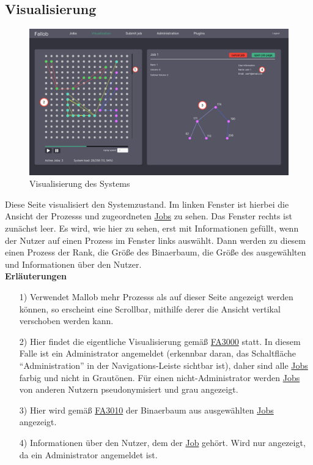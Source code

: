 \newpage
\subsection{Visualisierung}
\label{pages:visualization}
\begin{figure}[H]
    \centering
    \includegraphics[width=\textwidth]{images-interface/v6_interface/visualization_page_6.pdf}
    \caption{Visualisierung des Systems}
    \label{fig:visualization-page}
\end{figure}
Diese Seite visualisiert den \gls{Systemzustand}. Im linken Fenster ist hierbei die Ansicht der \glspl{Prozess} und zugeordneten \hyperref[B:Jobs]{Jobs} zu sehen. Das Fenster rechts ist zunächst leer. Es wird, wie hier zu sehen, erst mit Informationen gefüllt, wenn der \gls{Nutzer} auf einen Prozess im Fenster links auswählt. Dann werden zu diesem einen Prozess der Rank, die Größe des \gls{Binaerbaum}, die Größe des ausgewählten  und Informationen über den \gls{Nutzer}.\\

\textbf{Erläuterungen}
\begin{itemize}
    \item[1)] Verwendet Mallob mehr \glspl{Prozess} als auf dieser Seite angezeigt werden können, so erscheint eine Scrollbar, mithilfe derer die Ansicht vertikal verschoben werden kann.
    \item[2)] Hier findet die eigentliche Visualisierung gemäß \hyperref[FA:Web-Interface:Verifizieren eines Kontos]{FA3000} statt. In diesem Falle ist ein \gls{Administrator} angemeldet (erkennbar daran, das Schaltfläche \enquote{Administration} in der Navigations-Leiste sichtbar ist), daher sind alle \hyperref[B:Jobs]{Jobs} farbig und nicht in Grautönen. Für einen nicht-\gls{Administrator} werden \hyperref[B:Jobs]{Jobs} von anderen Nutzern pseudonymisiert und grau angezeigt.
    \item[3)] Hier wird gemäß \hyperref[FA:Visualisierung:Anzeigen des Binaerbaumes für einen Job]{FA3010} der \gls{Binaerbaum} aus ausgewählten \hyperref[B:Jobs]{Jobs} angezeigt.
    \item[4)] Informationen über den \gls{Nutzer}, dem der \hyperref[B:Jobs]{Job} gehört. Wird nur angezeigt, da ein \gls{Administrator} angemeldet ist.
\end{itemize}

